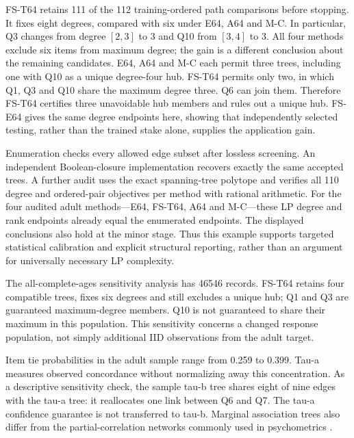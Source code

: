 \documentclass[11pt]{article}
\theoremstyle{plain}
\theoremstyle{definition}\newtheorem{remark}{Remark}\newtheorem{example}{Example}
\begin{document}



FS-T64 retains 111 of the 112 training-ordered path comparisons before stopping. It fixes eight degrees, compared with six under E64, A64 and M-C. In particular, Q3 changes from degree $[2,3]$ to 3 and Q10 from $[3,4]$ to 3. All four methods exclude six items from maximum degree; the gain is a different conclusion about the remaining candidates. E64, A64 and M-C each permit three trees, including one with Q10 as a unique degree-four hub. FS-T64 permits only two, in which Q1, Q3 and Q10 share the maximum degree three. Q6 can join them. Therefore FS-T64 certifies three unavoidable hub members and rules out a unique hub. FS-E64 gives the same degree endpoints here, showing that independently selected testing, rather than the trained stake alone, supplies the application gain.

Enumeration checks every allowed edge subset after lossless screening. An independent Boolean-closure implementation recovers exactly the same accepted trees. A further audit uses the exact spanning-tree polytope and verifies all 110 degree and ordered-pair objectives per method with rational arithmetic. For the four audited adult methods---E64, FS-T64, A64 and M-C---these LP degree and rank endpoints already equal the enumerated endpoints. The displayed conclusions also hold at the minor stage. Thus this example supports targeted statistical calibration and explicit structural reporting, rather than an argument for universally necessary LP complexity.

The all-complete-ages sensitivity analysis has 46546 records. FS-T64 retains four compatible trees, fixes six degrees and still excludes a unique hub; Q1 and Q3 are guaranteed maximum-degree members. Q10 is not guaranteed to share their maximum in this population. This sensitivity concerns a changed response population, not simply additional IID observations from the adult target.

Item tie probabilities in the adult sample range from 0.259 to 0.399. Tau-a measures observed concordance without normalizing away this concentration. As a descriptive sensitivity check, the sample tau-b tree shares eight of nine edges with the tau-a tree: it reallocates one link between Q6 and Q7. The tau-a confidence guarantee is not transferred to tau-b. Marginal association trees also differ from the partial-correlation networks commonly used in psychometrics \citep{epskamp2018}.
\end{document}
